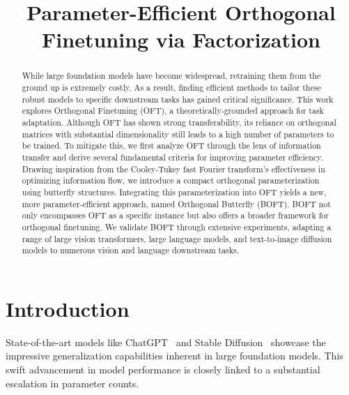 \title{Parameter-Efficient Orthogonal Finetuning via Factorization}

\begin{abstract}
While large foundation models have become widespread, retraining them from the ground up is extremely costly. As a result, finding efficient methods to tailor these robust models to specific downstream tasks has gained critical significance. This work explores Orthogonal Finetuning (OFT), a theoretically-grounded approach for task adaptation. Although OFT has shown strong transferability, its reliance on orthogonal matrices with substantial dimensionality still leads to a high number of parameters to be trained. To mitigate this, we first analyze OFT through the lens of information transfer and derive several fundamental criteria for improving parameter efficiency. Drawing inspiration from the Cooley-Tukey fast Fourier transform’s effectiveness in optimizing information flow, we introduce a compact orthogonal parameterization using butterfly structures. Integrating this parameterization into OFT yields a new, more parameter-efficient approach, named Orthogonal Butterfly (BOFT). BOFT not only encompasses OFT as a specific instance but also offers a broader framework for orthogonal finetuning. We validate BOFT through extensive experiments, adapting a range of large vision transformers, large language models, and text-to-image diffusion models to numerous vision and language downstream tasks.
\end{abstract}

\section{Introduction}

State-of-the-art models like ChatGPT~\cite{brown2020language,chen2021evaluating} and Stable Diffusion~\cite{rombach2022high} showcase the impressive generalization capabilities inherent in large foundation models. This swift advancement in model performance is closely linked to a substantial escalation in parameter counts.

